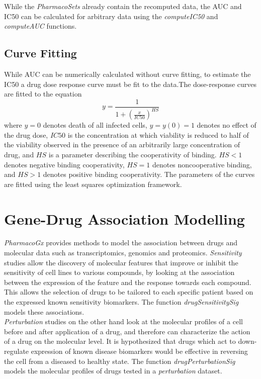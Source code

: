 \documentclass[11pt]{article}
\begin{document}
While the \textit{PharmacoSets} already contain the recomputed data, the AUC and IC50 can be calculated for arbitrary data using the \textit{computeIC50} and \textit{computeAUC} functions.  

\subsection{Curve Fitting}
While AUC can be numerically calculated without curve fitting, to estimate the IC50 a drug dose response curve must be fit to the data.The dose-response curves are fitted to the equation
$$y = \frac{1}{1+(\frac{x}{IC50})^{HS}}$$
where $y = 0$ denotes death of all infected cells, $y = y(0) = 1$ denotes no effect of the drug dose, $IC50$ is the concentration at which viability is reduced to half of the viability observed in the presence of an arbitrarily large concentration of drug, and $HS$ is a parameter describing the cooperativity of binding. $HS < 1$ denotes negative binding cooperativity, $HS = 1$ denotes noncooperative binding, and $HS > 1$ denotes positive binding cooperativity. The parameters of the curves are fitted using the least squares optimization framework.


\section{Gene-Drug Association Modelling}
\textit{PharmacoGx} provides methods to model the association between drugs and molecular data such as transcriptomics, genomics and proteomics. 
\textit{Sensitivity} studies allow the discovery of molecular features that improve or inhibit the sensitivity of cell lines to various compounds, by looking at the association between the expression of the feature and the response towards each compound. This allows the selection of drugs to be tailored to each specific patient based on the expressed known sensitivity biomarkers. The function \textit{drugSensitivitySig} models these associations.\\

\textit{Perturbation} studies on the other hand look at the molecular profiles of a cell before and after application of a drug, and therefore can characterize the action of a drug on the molecular level. It is hypothesized that drugs which act to down-regulate expression of known disease biomarkers would be effective in reversing the cell from a diseased to healthy state. The function \textit{drugPerturbationSig} models the molecular profiles of drugs tested in a \textit{perturbation} dataset.
\end{document}
